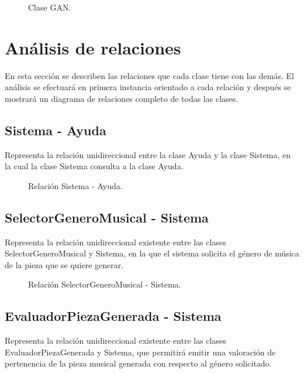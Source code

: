 \begin{figure}[H]
  \centering
  
  \caption{Clase GAN.}
\end{figure}

\section{Análisis de relaciones}

En esta sección se describen las relaciones que cada clase tiene con las demás. El análisis se efectuará en primera instancia orientado a cada relación y después se mostrará un diagrama de relaciones completo de todas las clases.

\subsection{Sistema - Ayuda}

Representa la relación unidireccional entre la clase Ayuda y la
clase Sistema, en la cual la clase Sistema consulta a la clase
Ayuda.

\begin{figure}[H]
  \centering
  
  \caption{Relación Sistema - Ayuda.}
\end{figure}

\subsection{SelectorGeneroMusical - Sistema}

Representa la relación unidireccional existente entre las clases SelectorGeneroMusical y Sistema, en la que el sistema solicita el género de música de la pieza que se quiere generar.

\begin{figure}[H]
  \centering
  
  \caption{Relación SelectorGeneroMusical - Sistema.}
\end{figure}

\subsection{EvaluadorPiezaGenerada - Sistema}

Representa la relación unidireccional existente entre las clases EvaluadorPiezaGenerada y Sistema, que permitirá emitir una valoración de pertenencia de la pieza musical generada con respecto al género solicitado.

